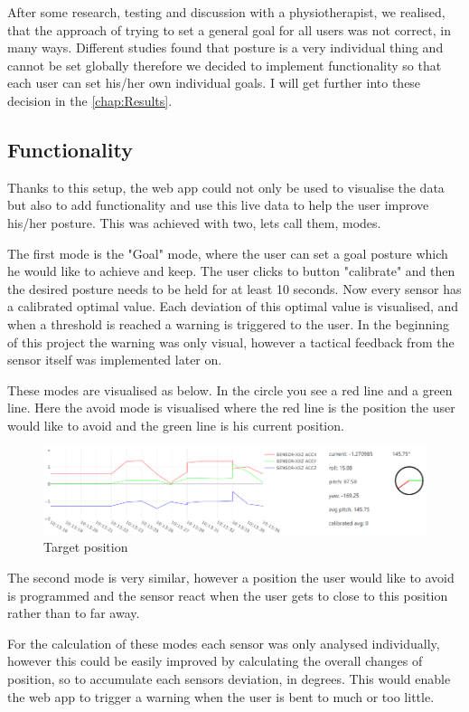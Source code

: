 After some research, testing and discussion with a physiotherapist, we realised, that the approach of trying to set a general goal for all users was not correct, in many ways. Different studies found that posture is a very individual thing and cannot be set globally \cite{SitUpSt77:online} therefore we decided to implement functionality so that each user can set his/her own individual goals. I will get further into these decision in the \ref{chap:Results}.

\subsection{Functionality}

Thanks to this setup, the web app could not only be used to visualise the data but also to add functionality and use this live data to help the user improve his/her posture. This was achieved with two, lets call them, modes. 

The first mode is the "Goal" mode, where the user can set a goal posture which he would like to achieve and keep. The user clicks to button "calibrate" and then the desired posture needs to be held for at least 10 seconds. 
Now every sensor has a calibrated optimal value. Each deviation of this optimal value is visualised, and when a threshold is reached a warning is triggered to the user. In the beginning of this project the warning was only visual, however a tactical feedback from the sensor itself was implemented later on.

These modes are visualised as below. In the circle you see a red line and a green line. Here the avoid mode is visualised where the red line is the position the user would like to avoid and the green line is his current position.

\begin{figure}[ht]
  \begin{center}
\includegraphics[width=\textwidth]{images/WebAppCircle.png}
  \end{center}
  \caption{Target position}
  \label{fig:TargetPosition}
\end{figure}

The second mode is very similar, however a position the user would like to avoid is programmed and the sensor react when the user gets to close to this position rather than to far away. 

For the calculation of these modes each sensor was only analysed individually, however this could be easily improved by calculating the overall changes of position, so to accumulate each sensors deviation, in degrees. This would enable the web app to trigger a warning when the user is bent to much or too little.